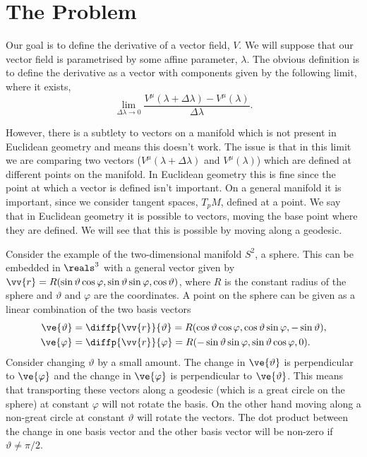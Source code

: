 \documentclass[fleqn]{NotesClass}
\begin{document}
    \section{The Problem}
    Our goal is to define the derivative of a vector field, \(V\).
    We will suppose that our vector field is parametrised by some affine parameter, \(\lambda\).
    The obvious definition is to define the derivative as a vector with components given by the following limit, where it exists, 
    \begin{equation}
        \lim_{\Delta \lambda \to 0} \frac{V^\mu(\lambda + \Delta \lambda) - V^\mu(\lambda)}{\Delta \lambda}.
    \end{equation}
    
    However, there is a subtlety to vectors on a manifold which is not present in Euclidean geometry and means this doesn't work.
    The issue is that in this limit we are comparing two vectors (\(V^\mu(\lambda + \Delta \lambda)\) and \(V^\mu(\lambda)\)) which are defined at different points on the manifold.
    In Euclidean geometry this is fine since the point at which a vector is defined isn't important.
    On a general manifold it is important, since we consider tangent spaces, \(T_pM\), defined at a point.
    We say that in Euclidean geometry it is possible to  vectors, moving the base point where they are defined.
    We will see that this is possible by moving along a geodesic.
    
    Consider the example of the two-dimensional manifold \(S^2\), a sphere.
    This can be embedded in \(\reals^3\) with a general vector given by \(\vv{r} = R(\sin\vartheta\cos\varphi, \sin\vartheta\sin\varphi, \cos\vartheta)\), where \(R\) is the constant radius of the sphere and \(\vartheta\) and \(\varphi\) are the coordinates.
    A point on the sphere can be given as a linear combination of the two basis vectors
    \begin{align}
        \ve{\vartheta} &= \diffp{\vv{r}}{\vartheta} = R(\cos\vartheta\cos\varphi, \cos\vartheta\sin\varphi, -\sin\vartheta),\\
        \ve{\varphi} &= \diffp{\vv{r}}{\varphi} = R(-\sin\vartheta\sin\varphi, \sin\vartheta\cos\varphi, 0).
    \end{align}
    Consider changing \(\vartheta\) by a small amount.
    The change in \(\ve{\vartheta}\) is perpendicular to \(\ve{\varphi}\) and the change in \(\ve{\varphi}\) is perpendicular to \(\ve{\vartheta}\).
    This means that transporting these vectors along a geodesic (which is a great circle on the sphere) at constant \(\varphi\) will not rotate the basis.
    On the other hand moving along a non-great circle at constant \(\vartheta\) will rotate the vectors.
    The dot product between the change in one basis vector and the other basis vector will be non-zero if \(\vartheta \ne \pi/2\).
    
\end{document}
